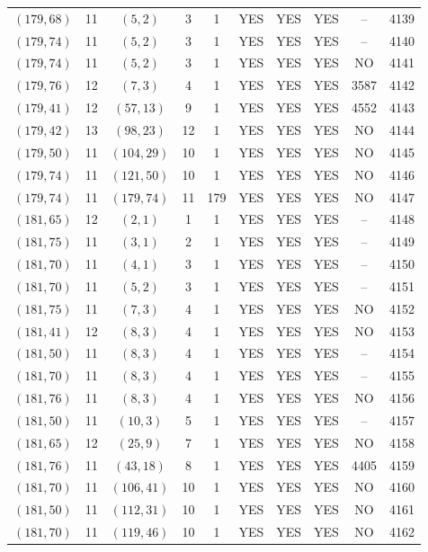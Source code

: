 \begin{longtable}{|c|c|c|c|c|c|c|c|c|c|}
$(179, 68)$ & 11 & $(5, 2)$ & 3 & 1 & YES & YES & YES & -- & 4139\\
$(179, 74)$ & 11 & $(5, 2)$ & 3 & 1 & YES & YES & YES & -- & 4140\\
$(179, 74)$ & 11 & $(5, 2)$ & 3 & 1 & YES & YES & YES & NO & 4141\\
$(179, 76)$ & 12 & $(7, 3)$ & 4 & 1 & YES & YES & YES & 3587 & 4142\\
$(179, 41)$ & 12 & $(57, 13)$ & 9 & 1 & YES & YES & YES & 4552 & 4143\\
$(179, 42)$ & 13 & $(98, 23)$ & 12 & 1 & YES & YES & YES & NO & 4144\\
$(179, 50)$ & 11 & $(104, 29)$ & 10 & 1 & YES & YES & YES & NO & 4145\\
$(179, 74)$ & 11 & $(121, 50)$ & 10 & 1 & YES & YES & YES & NO & 4146\\
$(179, 74)$ & 11 & $(179, 74)$ & 11 & 179 & YES & YES & YES & NO & 4147\\
$(181, 65)$ & 12 & $(2, 1)$ & 1 & 1 & YES & YES & YES & -- & 4148\\
$(181, 75)$ & 11 & $(3, 1)$ & 2 & 1 & YES & YES & YES & -- & 4149\\
$(181, 70)$ & 11 & $(4, 1)$ & 3 & 1 & YES & YES & YES & -- & 4150\\
$(181, 70)$ & 11 & $(5, 2)$ & 3 & 1 & YES & YES & YES & -- & 4151\\
$(181, 75)$ & 11 & $(7, 3)$ & 4 & 1 & YES & YES & YES & NO & 4152\\
$(181, 41)$ & 12 & $(8, 3)$ & 4 & 1 & YES & YES & YES & NO & 4153\\
$(181, 50)$ & 11 & $(8, 3)$ & 4 & 1 & YES & YES & YES & -- & 4154\\
$(181, 70)$ & 11 & $(8, 3)$ & 4 & 1 & YES & YES & YES & -- & 4155\\
$(181, 76)$ & 11 & $(8, 3)$ & 4 & 1 & YES & YES & YES & NO & 4156\\
$(181, 50)$ & 11 & $(10, 3)$ & 5 & 1 & YES & YES & YES & -- & 4157\\
$(181, 65)$ & 12 & $(25, 9)$ & 7 & 1 & YES & YES & YES & NO & 4158\\
$(181, 76)$ & 11 & $(43, 18)$ & 8 & 1 & YES & YES & YES & 4405 & 4159\\
$(181, 70)$ & 11 & $(106, 41)$ & 10 & 1 & YES & YES & YES & NO & 4160\\
$(181, 50)$ & 11 & $(112, 31)$ & 10 & 1 & YES & YES & YES & NO & 4161\\
$(181, 70)$ & 11 & $(119, 46)$ & 10 & 1 & YES & YES & YES & NO & 4162\\

\end{longtable}
